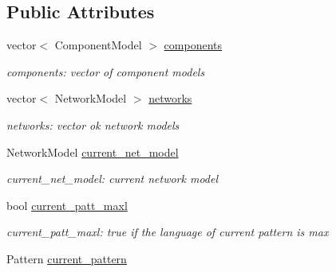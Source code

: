 \subsection*{Public Attributes}
\begin{DoxyCompactItemize}
\item 
vector$<$ Component\+Model $>$ \hyperlink{classspec__driver_adf12e35e8ac794efbc0c6c0b04dca443}{components}\hypertarget{classspec__driver_adf12e35e8ac794efbc0c6c0b04dca443}{}\label{classspec__driver_adf12e35e8ac794efbc0c6c0b04dca443}

\begin{DoxyCompactList}\small\item\em components\+: vector of component models \end{DoxyCompactList}\item 
vector$<$ Network\+Model $>$ \hyperlink{classspec__driver_a04e74c30d0ceac769f4b8f4a00ee639a}{networks}\hypertarget{classspec__driver_a04e74c30d0ceac769f4b8f4a00ee639a}{}\label{classspec__driver_a04e74c30d0ceac769f4b8f4a00ee639a}

\begin{DoxyCompactList}\small\item\em networks\+: vector ok network models \end{DoxyCompactList}\item 
Network\+Model \hyperlink{classspec__driver_a547f299187b1a5837cf03e2785d78da2}{current\+\_\+net\+\_\+model}\hypertarget{classspec__driver_a547f299187b1a5837cf03e2785d78da2}{}\label{classspec__driver_a547f299187b1a5837cf03e2785d78da2}

\begin{DoxyCompactList}\small\item\em current\+\_\+net\+\_\+model\+: current network model \end{DoxyCompactList}\item 
bool \hyperlink{classspec__driver_afcf21254f19afba075dc2ef8cb0dcd58}{current\+\_\+patt\+\_\+maxl}\hypertarget{classspec__driver_afcf21254f19afba075dc2ef8cb0dcd58}{}\label{classspec__driver_afcf21254f19afba075dc2ef8cb0dcd58}

\begin{DoxyCompactList}\small\item\em current\+\_\+patt\+\_\+maxl\+: true if the language of current pattern is max \end{DoxyCompactList}\item 
Pattern \hyperlink{classspec__driver_a5b6ed2f787740c74f515f2b4e53e17ce}{current\+\_\+pattern}\hypertarget{classspec__driver_a5b6ed2f787740c74f515f2b4e53e17ce}{}\label{classspec__driver_a5b6ed2f787740c74f515f2b4e53e17ce}


\end{DoxyCompactItemize}

